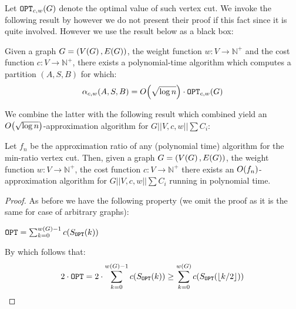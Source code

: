 Let $\texttt{OPT}_{c,w}\mathopen{}\left( G \right)$ denote the optimal value of such vertex cut.
We invoke the following result by \cite{Improvedapproximationalgorithmsvertexseparators} however we do not present their proof if this fact since it is quite involved. However we use the result below as a black box:
\begin{theorem}
    Given a graph $G=\mathopen{}\left( V\mathopen{}\left( G \right), E\mathopen{}\left( G \right) \right)$, the weight function $w:V\to \mathbb{N}^+$ and the cost function $c:V\to\mathbb{N}^+$, there exists a
polynomial-time algorithm which computes a partition $(A, S, B)$ for which:
$$
\alpha_{c,w}\mathopen{}\left( A,S,B \right)=O\mathopen{}\left( \sqrt{\log n
} \right)\cdot\texttt{OPT}_{c,w}\mathopen{}\left( G \right)
$$
\end{theorem}
We combine the latter with the following result which combined yield an $O\mathopen{}\left( \sqrt{\log n
} \right)$-approximation algorithm for $G||V,c,w||\sum C_i$:
\begin{theorem}
    Let $f_n$ be the approximation ratio of any (polynomial time) algorithm  for the min-ratio vertex cut. Then, given a graph $G=\mathopen{}\left( V\mathopen{}\left( G \right), E\mathopen{}\left( G \right) \right)$, the weight function $w:V\to \mathbb{N}^+$, the cost function $c:V\to\mathbb{N}^+$ there exists an $O\mathopen{}\left( f_n \right)$-approximation algorithm for $G||V,c,w||\sum C_i$ running in polynomial time.
    \begin{proof}
        
        As before we have the following property (we omit the proof as it is the same for case of arbitrary graphs):
        \begin{lemma} $\texttt{OPT}=\sum_{k=0}^{w\mathopen{}\left( G \right)-1}c\mathopen{}\left( S_{\texttt{OPT}}\mathopen{}\left( k \right) \right)$
        \end{lemma}
        By which follows that:
            $$
            2\cdot\texttt{OPT}= 2\cdot\sum_{k=0}^{w\mathopen{}\left( G \right)-1}c\mathopen{}\left( S_{\texttt{OPT}}\mathopen{}\left( k \right) \right) \geq \sum_{k=0}^{w\mathopen{}\left( G \right)}c\mathopen{}\left( S_{\texttt{OPT}}\mathopen{}\left( \mathopen{}\left\lfloor k/2 \right\rfloor \right) \right)
            $$
            

\end{proof}
\end{theorem}
